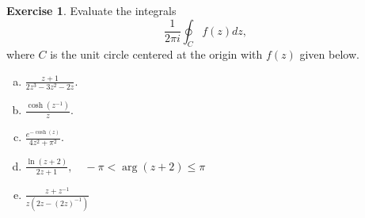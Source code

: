 \documentclass[12pt]{article}
\theoremstyle{definition}
\newtheorem{exer}{Exercise}
\theoremstyle{remark}
\begin{document}
\begin{exer}
    Evaluate the integrals 
    \begin{equation}
        \frac{1}{2\pi i} \oint_C f(z)dz,
    \end{equation}
    where $C$ is the unit circle centered at the origin with $f(z)$ given below.    

    \begin{enumerate}[(a)]
        \item  $ \frac{z+1}{2z^3 - 3z^2 -2z} $.
        \item $ \frac{\cosh(z^{-1})}{z}$.
        \item $ \frac{e^{-\cosh(z)}}{4z^2 + \pi^2}$.
        \item $\frac{\ln(z+2)}{2z+1}, \quad -\pi < \arg(z+2)\leq \pi$ 
        \item $\frac{z + z^{-1}}{z (2z - (2z)^{-1})}$
    \end{enumerate}
\end{exer}
 
\end{document}

